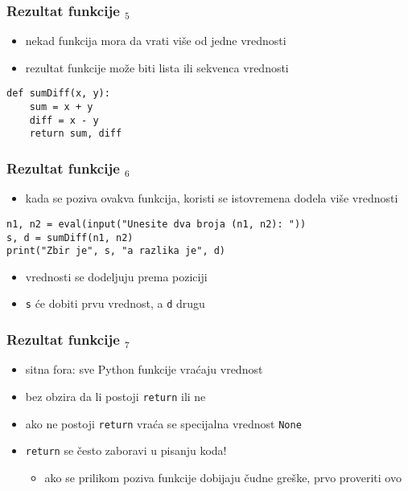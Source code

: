 \documentclass[utf8,compress,aspectratio=169]{beamer}
\begin{document}
\begin{frame}[fragile]
  \frametitle{Rezultat funkcije $_5$}
  \begin{itemize}
    \item nekad funkcija mora da vrati više od jedne vrednosti
    \item rezultat funkcije može biti lista ili sekvenca vrednosti
  \end{itemize}
\begin{verbatim}
def sumDiff(x, y):
    sum = x + y
    diff = x - y
    return sum, diff
\end{verbatim}
\end{frame}

\begin{frame}[fragile,shrink=5]
  \frametitle{Rezultat funkcije $_6$}
  \begin{itemize}
    \item kada se poziva ovakva funkcija, koristi se istovremena dodela više vrednosti
  \end{itemize}
\begin{verbatim}
n1, n2 = eval(input("Unesite dva broja (n1, n2): "))
s, d = sumDiff(n1, n2)
print("Zbir je", s, "a razlika je", d)
\end{verbatim}
  \begin{itemize}
    \item vrednosti se dodeljuju prema poziciji
    \item \texttt{s} će dobiti prvu vrednost, a \texttt{d} drugu
  \end{itemize}
\end{frame}

\begin{frame}[fragile]
  \frametitle{Rezultat funkcije $_7$}
  \begin{itemize}
    \item sitna fora: sve Python funkcije vraćaju vrednost
    \item bez obzira da li postoji \texttt{return} ili ne
    \item ako ne postoji \texttt{return} vraća se specijalna vrednost \texttt{None}
    \item \texttt{return} se često zaboravi u pisanju koda!
    \begin{itemize}
      \item ako se prilikom poziva funkcije dobijaju čudne greške, prvo proveriti ovo
    \end{itemize}
  \end{itemize}
\end{frame}
\end{document}
